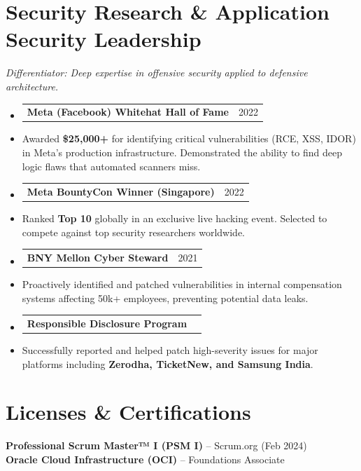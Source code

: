 \documentclass[letterpaper,11pt]{article}
\makeatletter
\newcommand{\resumeItem}[1]{
  \item\small{
    {#1 \vspace{3pt}} %
  }
}
\newcommand{\resumeProjectHeading}[2]{
    \item
    \begin{tabular*}{0.97\textwidth}{l@{\extracolsep{\fill}}r}
      \small#1 & #2 \\
    \end{tabular*}\vspace{-5pt}
}
\newcommand{\resumeSubHeadingListStart}{\begin{itemize}[leftmargin=0.15in, label={}]}
\newcommand{\resumeSubHeadingListEnd}{\end{itemize}}
\makeatother
\begin{document}
\section{Security Research \& Application Security Leadership}
\textit{\small Differentiator: Deep expertise in offensive security applied to defensive architecture.}
  \resumeSubHeadingListStart
    \resumeProjectHeading
        {\textbf{Meta (Facebook) Whitehat Hall of Fame}}{2022}
        \resumeItem{Awarded \textbf{\$25,000+} for identifying critical vulnerabilities (RCE, XSS, IDOR) in Meta's production infrastructure. Demonstrated the ability to find deep logic flaws that automated scanners miss.}
    \resumeProjectHeading
        {\textbf{Meta BountyCon Winner (Singapore)}}{2022}
        \resumeItem{Ranked \textbf{Top 10} globally in an exclusive live hacking event. Selected to compete against top security researchers worldwide.}
    \resumeProjectHeading
        {\textbf{BNY Mellon Cyber Steward}}{2021}
        \resumeItem{Proactively identified and patched vulnerabilities in internal compensation systems affecting 50k+ employees, preventing potential data leaks.}
    \resumeProjectHeading
        {\textbf{Responsible Disclosure Program}}{}
        \resumeItem{Successfully reported and helped patch high-severity issues for major platforms including \textbf{Zerodha, TicketNew, and Samsung India}.}
  \resumeSubHeadingListEnd


\section{Licenses \& Certifications}
 \begin{itemize}[leftmargin=0.15in, label={}]
    \small{\item{
     \textbf{Professional Scrum Master™ I (PSM I)} -- Scrum.org (Feb 2024) \\
     \textbf{Oracle Cloud Infrastructure (OCI)} -- Foundations Associate
    }}
 \end{itemize}


\end{document}
